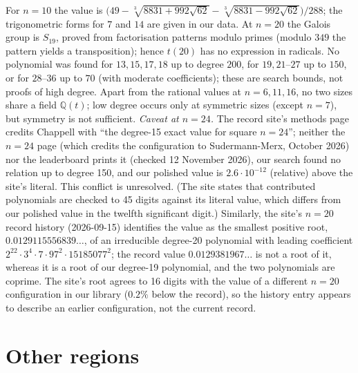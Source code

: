 \documentclass[11pt]{amsart}
\theoremstyle{definition}
\newcommand{\Q}{\mathbb{Q}}
\begin{document}
For $n = 10$ the value is $\bigl(49 - \sqrt[3]{8831 + 992\sqrt{62}} - \sqrt[3]{8831 - 992\sqrt{62}}\bigr)/288$; the trigonometric forms for $7$ and $14$ are given in our data. %
At $n = 20$ the Galois group is $S_{19}$, proved from factorisation patterns modulo primes (modulo $349$ the pattern yields a transposition); hence $t(20)$ has no expression in radicals. %
No polynomial was found for $13, 15, 17, 18$ up to degree $200$, for $19, 21$--$27$ up to $150$, or for $28$--$36$ up to $70$ (with moderate coefficients); these are search bounds, not proofs of high degree. Apart from the rational values at $n = 6, 11, 16$, no two sizes share a field $\Q(t)$; low degree occurs only at symmetric sizes (except $n = 7$), but symmetry is not sufficient. %
\emph{Caveat at $n = 24$.} The record site's methods page credits Chappell with ``the degree-15 exact value for square $n = 24$''; neither the $n = 24$ page (which credits the configuration to Sudermann-Merx, October 2026) nor the leaderboard prints it (checked 12 November 2026), our search found no relation up to degree 150, and our polished value is $2.6\cdot10^{-12}$ (relative) above the site's literal. This conflict is unresolved. (The site states that contributed polynomials are checked to 45 digits against its literal value, which differs from our polished value in the twelfth significant digit.) Similarly, the site's $n = 20$ record history (2026-09-15) identifies the value as the smallest positive root, $0.0129115556839\ldots$, of an irreducible degree-20 polynomial with leading coefficient $2^{22}\cdot3^4\cdot7\cdot97^2\cdot15185077^2$; the record value $0.0129381967\ldots$ is not a root of it, whereas it is a root of our degree-19 polynomial, and the two polynomials are coprime. The site's root agrees to 16 digits with the value of a different $n = 20$ configuration in our library ($0.2\%$ below the record), so the history entry appears to describe an earlier configuration, not the current record. %

\section{Other regions}\label{sec:regions}
\end{document}
